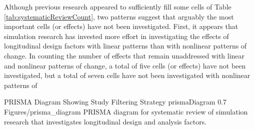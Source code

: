\documentclass[
12pt, %
twoside,
english]{guelphthesis}
\begin{document}
Although previous research appeared to sufficiently fill some cells of Table \ref{tab:systematicReviewCount}, two patterns suggest that arguably the most important cells (or effects) have not been investigated. First, it appears that simulation research has invested more effort in investigating the effects of longitudinal design factors with linear patterns than with nonlinear patterns of change. In counting the number of effects that remain unaddressed with linear and nonlinear patterns of change, a total of five cells (or effects) have not been investigated, but a total of seven cells have not been investigated with nonlinear patterns of
\begin{apaFigure}
[landscape]
{PRISMA Diagram Showing Study Filtering Strategy}
{prismaDiagram}
{0.7}
{Figures/prisma_diagram}
{PRISMA diagram for systematic review of simulation research that investigates longitudinal design and analysis factors.}
\end{apaFigure}
\end{document}
